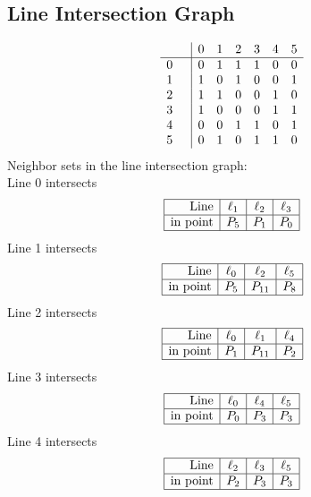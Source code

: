 \documentclass{article}
\begin{document}
{\subsection*{Line Intersection Graph}
{\arraycolsep=1pt
$$
\begin{array}{rr|*{6}r}
 &  & 0 & 1 & 2 & 3 & 4 & 5\\
\hline
0 &  & 0 & 1 & 1 & 1 & 0 & 0\\
1 &  & 1 & 0 & 1 & 0 & 0 & 1\\
2 &  & 1 & 1 & 0 & 0 & 1 & 0\\
3 &  & 1 & 0 & 0 & 0 & 1 & 1\\
4 &  & 0 & 0 & 1 & 1 & 0 & 1\\
5 &  & 0 & 1 & 0 & 1 & 1 & 0\\
\end{array}
$$
}%
Neighbor sets in the line intersection graph:\\
Line 0 intersects 
$$
\begin{array}{|r*{3}{|c}|}
\hline
\mbox{Line}  & \ell_{1} & \ell_{2} & \ell_{3}\\
\hline
\mbox{in point}  & P_{5} & P_{1} & P_{0}\\
\hline
\end{array}
$$
Line 1 intersects 
$$
\begin{array}{|r*{3}{|c}|}
\hline
\mbox{Line}  & \ell_{0} & \ell_{2} & \ell_{5}\\
\hline
\mbox{in point}  & P_{5} & P_{11} & P_{8}\\
\hline
\end{array}
$$
Line 2 intersects 
$$
\begin{array}{|r*{3}{|c}|}
\hline
\mbox{Line}  & \ell_{0} & \ell_{1} & \ell_{4}\\
\hline
\mbox{in point}  & P_{1} & P_{11} & P_{2}\\
\hline
\end{array}
$$
Line 3 intersects 
$$
\begin{array}{|r*{3}{|c}|}
\hline
\mbox{Line}  & \ell_{0} & \ell_{4} & \ell_{5}\\
\hline
\mbox{in point}  & P_{0} & P_{3} & P_{3}\\
\hline
\end{array}
$$
Line 4 intersects 
$$
\begin{array}{|r*{3}{|c}|}
\hline
\mbox{Line}  & \ell_{2} & \ell_{3} & \ell_{5}\\
\hline
\mbox{in point}  & P_{2} & P_{3} & P_{3}\\
\hline
\end{array}
$$}
\end{document}
